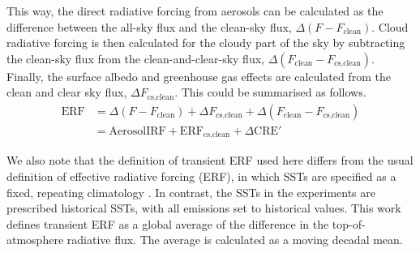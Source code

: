 This way, the direct radiative forcing from aerosols can be calculated as the difference between the all-sky flux and the clean-sky flux, $\Delta(F - F_{\text{clean}})$. Cloud radiative forcing is then calculated for the cloudy part of the sky by subtracting the clean-sky flux from the clean-and-clear-sky flux, $\Delta(F_{\text{clean}} - F_{\text{cs,clean}})$. Finally, the surface albedo and greenhouse gas effects are calculated from the clean and clear sky flux, $\Delta F_{\text{cs,clean}}$. This could be summarised as follows.
\begin{align}
\label{eq:erf}
\text{ERF} &=  \Delta(F-F_{\text{clean}}) + \Delta F_{\text{cs,clean}} + \Delta ({F_{\text{clean}}-F_{\text {cs,clean}}}) \\
 & = \text{AerosolIRF} + \text{ERF}_{\text{cs,clean}}+\Delta \text{CRE}'
\end{align}

We also note that the definition of transient ERF used here differs from the usual definition of effective radiative forcing (ERF), in which SSTs are specified as a fixed, repeating climatology \citep{eyringOverviewCoupledModel2016}. In contrast, the SSTs in the experiments are prescribed historical SSTs, with all emissions set to historical values. This work defines transient ERF as a global average of the difference in the top-of-atmosphere radiative flux. The average is calculated as a moving decadal mean.   

